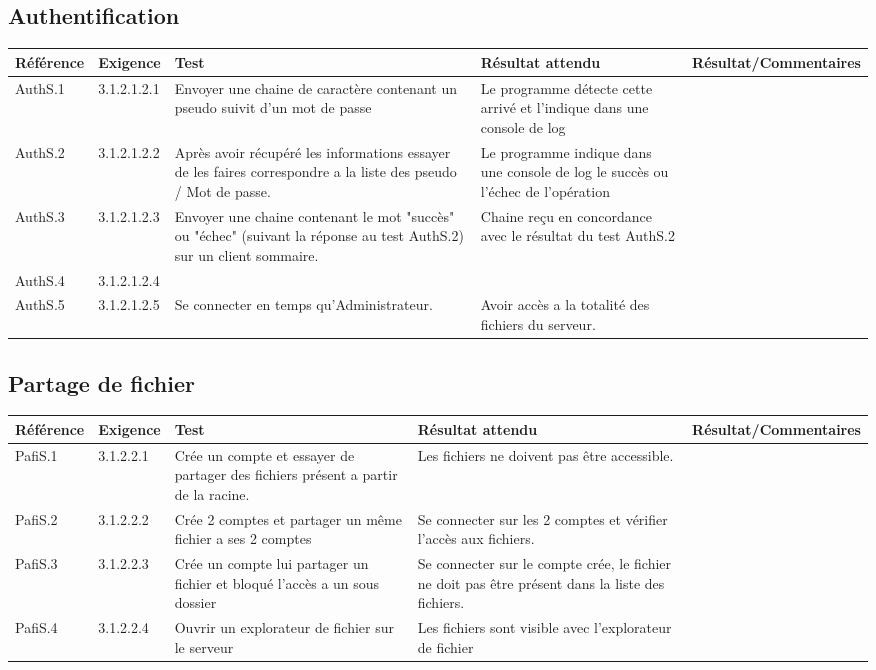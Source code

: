 \documentclass[10pt,a4paper,landscape]{report}
\begin{document}
\subsection{Authentification}
\begin{center}
	\bgroup
	\def\arraystretch{1.5}
	\begin{tabular}{|p{1.5cm}|p{2cm}|p{8.5cm}|p{8.5cm}|p{5cm}|}
		\hline
		\rowcolor{gris}Référence & Exigence & Test & Résultat attendu & Résultat/Commentaires\\
		\hline
		AuthS.1 & 3.1.2.1.2.1 & Envoyer une chaine de caractère contenant un pseudo suivit d'un mot de passe & Le programme détecte cette arrivé et l'indique dans une console de log & \\
		\hline		
		AuthS.2 & 3.1.2.1.2.2 & Après avoir récupéré les informations essayer de les faires correspondre a la liste des pseudo / Mot de passe. & Le programme indique dans une console de log le succès ou l'échec de l'opération & \\
		\hline		
		AuthS.3 & 3.1.2.1.2.3 & Envoyer une chaine contenant le mot "succès" ou "échec" (suivant la réponse au test AuthS.2) sur un client sommaire. & Chaine reçu en concordance avec le résultat du test AuthS.2 & \\
		\hline		
		AuthS.4 & 3.1.2.1.2.4 & & & \\
		\hline
		AuthS.5 & 3.1.2.1.2.5 & Se connecter en temps qu'Administrateur. &  Avoir accès a la totalité des fichiers du serveur. & \\
		\hline
	\end{tabular}
	\egroup
\end{center}

\subsection{Partage de fichier}
\begin{center}
	\bgroup
	\def\arraystretch{1.5}
	\begin{tabular}{|p{1.5cm}|p{2cm}|p{8.5cm}|p{8.5cm}|p{5cm}|}
		\hline
		\rowcolor{gris}Référence & Exigence & Test & Résultat attendu & Résultat/Commentaires\\
		\hline
		PafiS.1 & 3.1.2.2.1 & Crée un compte et essayer de partager des fichiers présent a partir de la racine. & Les fichiers ne doivent pas être accessible. & \\
		\hline
		PafiS.2 & 3.1.2.2.2 & Crée 2 comptes et partager un même fichier a ses 2 comptes & Se connecter sur les 2 comptes et vérifier l'accès aux fichiers. & \\
		\hline
		PafiS.3 & 3.1.2.2.3 & Crée un compte lui partager un fichier et bloqué l'accès a un sous dossier & Se connecter sur le compte crée, le fichier ne doit pas être présent dans la liste des fichiers. & \\
		\hline
		PafiS.4 & 3.1.2.2.4 & Ouvrir un explorateur de fichier sur le serveur & Les fichiers sont visible avec l'explorateur de fichier & \\
		\hline
	\end{tabular}
	\egroup
\end{center}
\end{document}
